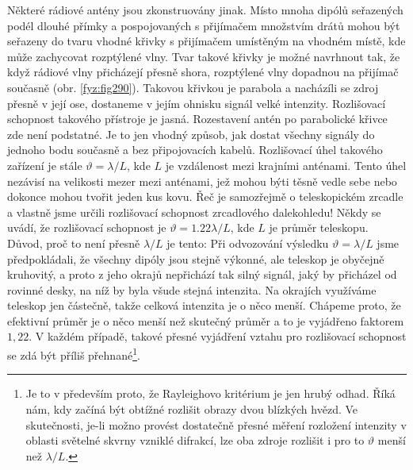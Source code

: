 {    Některé rádiové antény jsou zkonstruovány jinak. Místo mnoha dipólů seřazených podél dlouhé 
    přímky a pospojovaných s přijímačem množstvím drátů mohou být seřazeny do tvaru vhodné křivky s 
    přijímačem umístěným na vhodném místě, kde může zachycovat rozptýlené vlny. Tvar takové křivky 
    je možné navrhnout tak, že když rádiové vlny přicházejí přesně shora, rozptýlené vlny dopadnou 
    na přijímač současně (obr. \ref{fyz:fig290}). Takovou křivkou je parabola a nacházíli se zdroj 
    přesně v její ose, dostaneme v jejím ohnisku signál velké intenzity. Rozlišovací schopnost 
    takového přístroje je jasná. Rozestavení antén po parabolické křivce zde není podstatné. Je to 
    jen vhodný způsob, jak dostat všechny signály do jednoho bodu současně a bez připojovacích 
    kabelů. Rozlišovací úhel takového zařízení je stále  \(\vartheta =  \lambda/L\), kde \(L\) je 
    vzdálenost mezi krajními anténami. Tento úhel nezávisí na velikosti mezer mezi anténami, jež 
    mohou býti těsně vedle sebe nebo dokonce mohou tvořit jeden kus kovu. Řeč je samozřejmě o 
    teleskopickém zrcadle a vlastně jsme určili rozlišovací schopnost zrcadlového dalekohledu! 
    Někdy se uvádí, že rozlišovací schopnost je \(\vartheta = \num{1.22}\lambda/L\), kde \(L\) je 
    průměr teleskopu. Důvod, proč to není přesně \(\lambda/L\) je tento: Při odvozování výsledku 
    \(\vartheta = \lambda/L\) jsme předpokládali, že všechny dipóly jsou stejně výkonné, ale 
    teleskop je obyčejně kruhovitý, a proto z jeho okrajů nepřichází tak silný signál, jaký by 
    přicházel od rovinné desky, na níž by byla všude stejná intenzita. Na okrajích využíváme 
    teleskop jen částečně, takže celková intenzita je o něco menší. Chápeme proto, že efektivní 
    průměr je o něco menší než skutečný průměr a to je vyjádřeno faktorem \(1,22\). V každém 
    případě, takové přesné vyjádření vztahu pro rozlišovací schopnost se zdá být příliš 
    přehnané\footnote{ Je to v především proto, že Rayleighovo kritérium je jen hrubý odhad. Říká 
    nám, kdy začíná být obtížné rozlišit obrazy dvou blízkých hvězd. Ve skutečnosti, je-li možno 
    provést dostatečně přesné měření rozložení intenzity v oblasti světelné skvrny vzniklé 
    difrakcí, lze oba zdroje rozlišit i pro to \(\vartheta\) menší než \(\lambda/L\).}.
    
}
